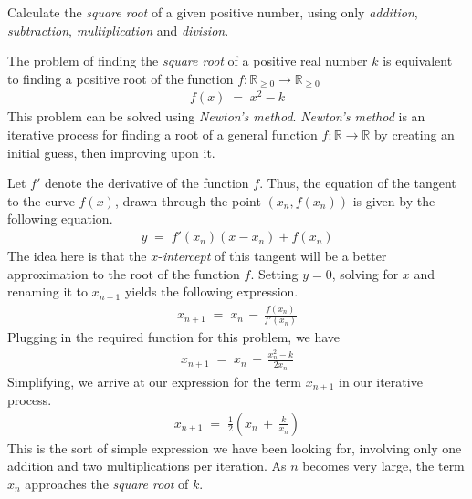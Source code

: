 

\problem Calculate the \textit{square root} of a given positive number, using only \textit{addition}, \textit{subtraction}, \textit{multiplication}
and \textit{division}.

\solution
The problem of finding the \textit{square root} of a positive real number $k$ is equivalent to finding a positive root of the function 
$f : \mathbb{R}_{\ge 0} \to \mathbb{R}_{\ge 0} $
\begin{align*}
	f(x) \;=\; x^2 - k
\end{align*}
This problem can be solved using \textit{Newton's method}. \textit{Newton's method} is an iterative process for finding a root of a general function
$f : \mathbb{R} \to \mathbb{R}$ by creating an initial guess, then improving upon it. 
\par
Let $f'$ denote the derivative of the function $f$. Thus, the equation of the tangent to the curve $f(x)$, drawn through the
point $(x_n, f(x_n))$ is given by the following equation.
\begin{align*}
	y \;=\; f'(x_n)(x - x_n) + f(x_n)
\end{align*}
The idea here is that the $x$-\textit{intercept} of this tangent will be a better approximation to the root of the function $f$. Setting
$y = 0$, solving for $x$ and renaming it to $x_{n+1}$ yields the following expression.
\begin{align*}
	x_{n+1} \;=\; x_n \,-\, \frac{f(x_n)}{f'(x_n)}
\end{align*}
Plugging in the required function for this problem, we have
\begin{align*}
	x_{n+1} \;=\; x_n \,-\, \frac{x_n^2 - k}{2x_n}
\end{align*}
Simplifying, we arrive at our expression for the term $x_{n+1}$ in our iterative process.
\begin{align*}
	x_{n+1} \;=\; \frac{1}{2} \left( x_n \,+\, \frac{k}{x_n} \right)
\end{align*}
This is the sort of simple expression we have been looking for, involving only one addition and two multiplications per iteration.
As $n$ becomes very large, the term $x_n$ approaches the \textit{square root} of $k$.

